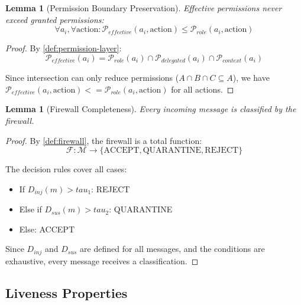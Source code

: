 \documentclass[
]{article}
\newtheorem{lemma}[theorem]{Lemma}
\begin{document}
\begin{lemma}[Permission Boundary Preservation]
\label{lem:permission-boundary}
Effective permissions never exceed granted permissions:
\begin{equation}
\label{eq:permission-bound}
\forall a_i, \forall \text{action}: \mathcal{P}_{effective}(a_i, \text{action}) \leq \mathcal{P}_{role}(a_i, \text{action})
\end{equation}
\end{lemma}

\begin{proof}
By \cref{def:permission-layer}:
\begin{equation}
\label{eq:permission-intersection}
\mathcal{P}_{effective}(a_i) = \mathcal{P}_{role}(a_i) \cap \mathcal{P}_{delegated}(a_i) \cap \mathcal{P}_{context}(a_i)
\end{equation}

Since intersection can only reduce permissions ($A \cap B \cap C \subseteq A$), we have $\mathcal{P}_{effective}(a_i, \text{action}) <= \mathcal{P}_{role}(a_i, \text{action})$ for all actions.
\end{proof}

\begin{lemma}[Firewall Completeness]
\label{lem:firewall-completeness}
Every incoming message is classified by the firewall.
\end{lemma}

\begin{proof}
By \cref{def:firewall}, the firewall is a total function:
\begin{equation}
\label{eq:firewall-function}
\mathcal{F}: \mathcal{M} \to \{\text{ACCEPT}, \text{QUARANTINE}, \text{REJECT}\}
\end{equation}

The decision rules cover all cases:
\begin{itemize}
\item If $D_{inj}(m) > tau_1$: REJECT
\item Else if $D_{sus}(m) > tau_2$: QUARANTINE
\item Else: ACCEPT
\end{itemize}

Since $D_{inj}$ and $D_{sus}$ are defined for all messages, and the conditions are exhaustive, every message receives a classification.
\end{proof}

\subsection{Liveness Properties}\label{sec:liveness-properties}
\end{document}
